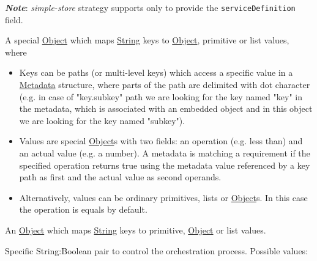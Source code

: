 \documentclass[a4paper]{arrowhead}
\newcommand{\pdef}[1]{{\textcolor{ArrowheadGrey}{#1\label{sec:model:primitives:#1}\label{sec:model:primitives:#1s}\label{sec:model:primitives:#1es}}}}
\newcommand{\pref}[1]{{\textcolor{ArrowheadGrey}{\hyperref[sec:model:primitives:#1]{#1}}}}
\begin{document}
\textbf{\textit{Note}}: \textit{simple-store} strategy supports only to provide the \texttt{serviceDefinition} field. 


A special \pref{Object} which maps \pref{String} keys to \pref{Object}, primitive or list values, where 

\begin{itemize}
    \item Keys can be paths (or multi-level keys) which access a specific value in a \hyperref[sec:model:Metadata]{Metadata} structure, where parts of the path are delimited with dot character (e.g. in case of "key.subkey" path we are looking for the key named "key" in the metadata, which is associated with an embedded object and in this object we are looking for the key named "subkey").
    \item Values are special \pref{Object}s with two fields: an operation (e.g. less than) and an actual value (e.g. a number). A metadata is matching a requirement if the specified operation returns true using the metadata value referenced by a key path as first and the actual value as second operands. 
    \item Alternatively, values can be ordinary primitives, lists or \pref{Object}s. In this case the operation is equals by default.
\end{itemize}


An \pref{Object} which maps \pref{String} keys to primitive, \pref{Object} or list values.


Specific \pdef{String}:\pdef{Boolean} pair to control the orchestration process. Possible values:
\end{document}
